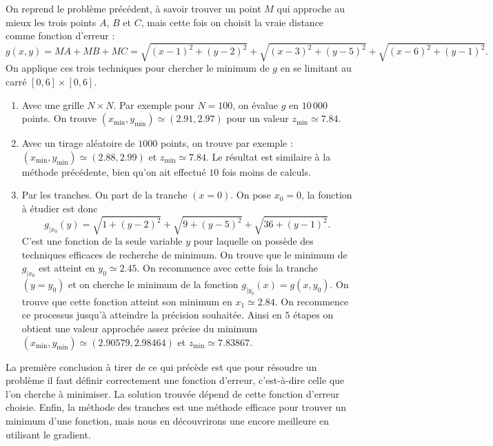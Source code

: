 \documentclass[11pt,class=report,crop=false]{standalone}
\begin{document}
\begin{exemple}
On reprend le problème précédent, à savoir trouver un point $M$ qui approche au mieux les trois points $A$, $B$ et $C$, mais cette fois on choisit la \og{}vraie\fg{} distance comme fonction d'erreur :
$$g(x,y) = MA+MB+MC = 
\sqrt{(x-1)^2+ (y-2)^2} + \sqrt{(x-3)^2 + (y-5)^2} + \sqrt{(x-6)^2 + (y-1)^2}.$$
On applique ces trois techniques pour chercher le minimum de $g$ en se limitant au carré $[0,6]\times[0,6]$.

\begin{enumerate}

  \item Avec une grille $N\times N$. Par exemple pour $N=100$, on évalue $g$ en $10\,000$ points. On trouve $(x_{\min},y_{\min}) \simeq (2.91,2.97)$ pour un valeur $z_{\min} \simeq 7.84$. 
  
  \item Avec un tirage aléatoire de $1000$ points, on trouve par exemple :
  $(x_{\min},y_{\min}) \simeq (2.88,2.99)$ et $z_{\min} \simeq 7.84$. Le résultat est similaire à la méthode précédente, bien qu'on ait effectué $10$ fois moins de calculs.
  
  \item Par les tranches. On part de la tranche $(x=0)$. On pose $x_0=0$, la fonction à étudier
  est donc 
  $$g_{|x_0}(y) = \sqrt{1 + (y-2)^2} + \sqrt{9 + (y-5)^2} + \sqrt{36 + (y-1)^2}.$$
  C'est une fonction de la seule variable $y$ pour laquelle on possède des techniques efficaces de recherche de minimum.
  On trouve que le minimum de $g_{|x_0}$ est atteint en $y_0 \simeq 2.45$.
  On recommence avec cette fois la tranche $(y = y_0)$ et on cherche le minimum de la fonction $g_{|y_0}(x) = g(x,y_0)$. On trouve que cette fonction atteint son minimum en $x_1 \simeq 2.84$. 
  On recommence ce processus jusqu'à atteindre la précision souhaitée.
  Ainsi en $5$ étapes on obtient une valeur approchée assez précise du minimum 
  $(x_{\min},y_{\min}) \simeq (2.90579,2.98464)$ et $z_{\min} \simeq 7.83867$.
  
  
\end{enumerate}
\end{exemple}

La première conclusion à tirer de ce qui précède est que pour résoudre un problème il faut définir correctement une fonction d'erreur, c'est-à-dire celle que l'on cherche à minimiser. La solution trouvée dépend de cette fonction d'erreur choisie. 
Enfin, la méthode des tranches est une méthode efficace pour trouver un minimum d'une fonction, mais nous en découvrirons une encore meilleure en utilisant le gradient.
\end{document}

